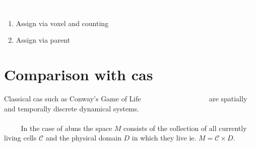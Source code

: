\documentclass{article}
\newcommand{\todo}[1]{\colorbox{WildStrawberry}{\textcolor{white}{#1}}}
\begin{document}
\todo{practial implementations of Index choosing}
\begin{enumerate}
    \item Assign via voxel and counting
    \item Assign via parent
\end{enumerate}

\section{Comparison with \aclp{ca}}
\label{section:comparison-with-ca}
Classical \acp{ca} such as Conway's Game of Life \cite{games1970fantastic} \todo{MORE CITATIONS}
are spatially and temporally discrete dynamical systems.
\todo{More details about \acp{ca}}
\todo{Cells are not tracable through time and space}
\todo{division and death}
\todo{distinction to migration not clear}
In the case of \acp{abm} the space $M$ consists of the collection of all currently living cells
$\mathscr{C}$ and the physical domain $D$ in which they live ie. $M=\mathscr{C}\times D$.
\end{document}
